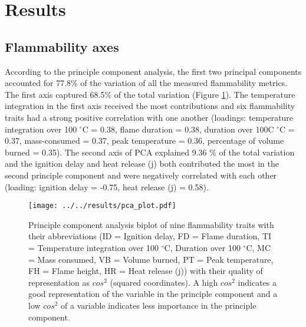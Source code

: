 \documentclass{ttuthes2007}
\begin{document}




\section{Results}

\subsection{Flammability axes}
According to the principle component analysis, the first two principal components accounted for 77.8\% of the variation of all the measured flammability metrics. The first axis %
captured 68.5\% of the total variation (Figure \ref{fig:pca-plot}). The temperature integration in the first axis received the most contributions and six flammability traits had a strong positive correlation with one another (loadings: temperature integration over 100 $^{\circ}$C = 0.38, flame duration = 0.38, duration over 100C $^{\circ}$C = 0.37, mass-consumed = 0.37, peak temperature  = 0.36, percentage of volume burned = 0.35). The second axis of PCA explained 9.36 \% of the total variation and the ignition delay and heat release (j) both contributed the most in the second principle component and were negatively correlated with each other (loading: ignition delay = -0.75, heat release (j) = 0.58). 

\begin{figure}  %
    \centering
    \texttt{[image: ../../results/pca\_plot.pdf]}
    \caption[Principle components results]{\label{fig:pca-plot} Principle component analysis biplot of nine flammability traits with their abbreviations (ID = Ignition delay, FD = Flame duration, TI = Temperature integration over 100 $^{\circ}$C, Duration over 100 $^{\circ}$C, MC = Mass consumed, VB = Volume burned, PT = Peak temperature, FH = Flame height, HR = Heat release (j)) with their quality of representation as $cos^2$ (squared coordinates). A high $cos^2$ indicates a good representation of the variable in the principle component and a low $cos^2$ of a variable indicates less importance in the principle component.}
  \end{figure}
\end{document}

